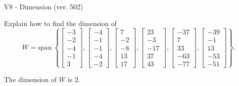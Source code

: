 \begin{exercise}
  \begin{exerciseTitle}V8 - Dimension (ver. 502)\end{exerciseTitle}
  \begin{exerciseStatement}
    Explain how to find the dimension of 
\[W=\mathrm{span}\ \left\{\left[\begin{array}{r}
-3 \\
-2 \\
-4 \\
-1 \\
3
\end{array}\right] , \left[\begin{array}{r}
-4 \\
-1 \\
-1 \\
-4 \\
-2
\end{array}\right] , \left[\begin{array}{r}
7 \\
-2 \\
-8 \\
13 \\
17
\end{array}\right] , \left[\begin{array}{r}
23 \\
-3 \\
-17 \\
37 \\
43
\end{array}\right] , \left[\begin{array}{r}
-37 \\
7 \\
33 \\
-63 \\
-77
\end{array}\right] , \left[\begin{array}{r}
-39 \\
-1 \\
13 \\
-53 \\
-51
\end{array}\right]\right\}.\]



  \end{exerciseStatement}
  \begin{exerciseAnswer}
   The dimension of \(W\) is  \(2\).
  


  \end{exerciseAnswer}
\end{exercise}
